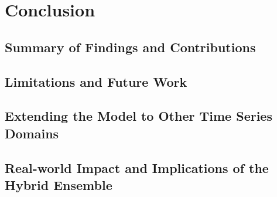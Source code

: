 \chapter{Conclusion}

\section{Summary of Findings and Contributions} %

\section{Limitations and Future Work} %

\section{Extending the Model to Other Time Series Domains} %

\section{Real-world Impact and Implications of the Hybrid Ensemble} %
